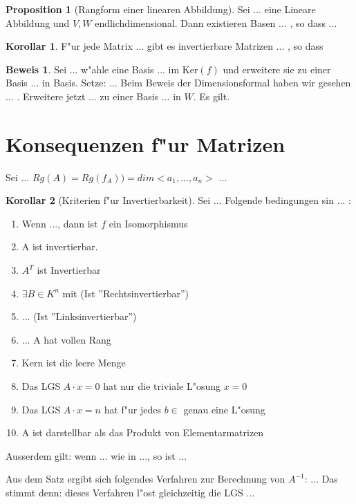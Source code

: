 \documentclass[oneside,fontsize=11pt,paper=a4,BCOR=0mm,DIV=12,automark,headsepline]{scrbook}
\theoremstyle{remark}
\theoremstyle{definition}
\newtheorem*{proposition}{Proposition}
\newtheorem*{korollar}{Korollar}
\theoremstyle{definition}
\newtheorem*{prof}{Beweis}
\theoremstyle{remark}
\begin{document}
\begin{proposition}[Rangform einer linearen Abbildung]
  Sei ... eine Lineare Abbildung und $V,W$ endlichdimensional. Dann existieren
  Basen ... , so dass ...
\end{proposition}

\begin{korollar}
  F"ur jede Matrix ... gibt es invertierbare Matrizen ... , so dass
\end{korollar}

\begin{prof}
  Sei ... w"ahle eine Basis ... im $\text{Ker}(f)$  und erweitere sie zu einer
  Basis ... in Basis. Setze: ... Beim Beweis der Dimensionsformal haben wir
  gesehen ... . Erweitere jetzt ... zu einer Basis ... in $W$. Es gilt. 
\end{prof}

\section{Konsequenzen f"ur Matrizen}
\label{sec:konsma}

Sei ...
$Rg(A)=Rg(f_A))=dim<a_1,...,a_n>$ ...

\begin{korollar}[Kriterien f"ur Invertierbarkeit]
  Sei ... Folgende bedingungen sin ... :
  \begin{enumerate}
  \item Wenn ..., dann ist $f$ ein Isomorphismus
  \item A ist invertierbar.
  \item $A^T$ ist Invertierbar
  \item $\exists B\in K^n$ mit (Ist ''Rechtsinvertierbar'')
  \item ... (Ist ''Linksinvertierbar'')
  \item ... A hat vollen Rang
  \item Kern ist die leere Menge
  \item Das LGS $A\cdot x = 0$ hat nur die triviale L"osung $x=0$
  \item Das LGS $A\cdot x = n$ hat f"ur jedes $b\in $ genau eine L"osung
  \item A ist darstellbar als das Produkt von Elementarmatrizen
  \end{enumerate}

  Ausserdem gilt: wenn ... wie in ..., so ist ... 
\end{korollar}

Aus dem Satz ergibt sich folgendes Verfahren zur Berechnung von $A^{-1}$: ...
Das stimmt denn: dieses Verfahren l"ost gleichzeitig die LGS ...
\end{document}
